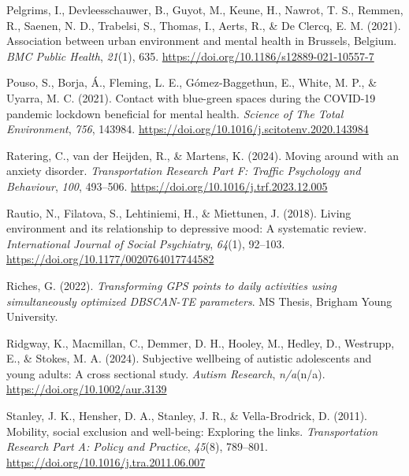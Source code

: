 \documentclass[
  letterpaper,
  number,
  review,
  3p]{elsarticle}
\newlength{\cslhangindent}
\newenvironment{CSLReferences}[2] %
 {\begin{list}{}{%
  \setlength{\itemindent}{0pt}
  \setlength{\leftmargin}{0pt}
  \setlength{\parsep}{0pt}
  \ifodd #1
   \setlength{\leftmargin}{\cslhangindent}
   \setlength{\itemindent}{-1\cslhangindent}
  \fi
  \setlength{\itemsep}{#2\baselineskip}}}
 {\end{list}}
\begin{document}
\begin{CSLReferences}{1}{0}
Pelgrims, I., Devleesschauwer, B., Guyot, M., Keune, H., Nawrot, T. S.,
Remmen, R., Saenen, N. D., Trabelsi, S., Thomas, I., Aerts, R., \& De
Clercq, E. M. (2021). Association between urban environment and mental
health in {Brussels}, {Belgium}. \emph{BMC Public Health}, \emph{21}(1),
635. \url{https://doi.org/10.1186/s12889-021-10557-7}

Pouso, S., Borja, Á., Fleming, L. E., Gómez-Baggethun, E., White, M. P.,
\& Uyarra, M. C. (2021). Contact with blue-green spaces during the
{COVID-19} pandemic lockdown beneficial for mental health. \emph{Science
of The Total Environment}, \emph{756}, 143984.
\url{https://doi.org/10.1016/j.scitotenv.2020.143984}

Ratering, C., van der Heijden, R., \& Martens, K. (2024). Moving around
with an anxiety disorder. \emph{Transportation Research Part F: Traffic
Psychology and Behaviour}, \emph{100}, 493--506.
\url{https://doi.org/10.1016/j.trf.2023.12.005}

Rautio, N., Filatova, S., Lehtiniemi, H., \& Miettunen, J. (2018).
Living environment and its relationship to depressive mood: {A}
systematic review. \emph{International Journal of Social Psychiatry},
\emph{64}(1), 92--103. \url{https://doi.org/10.1177/0020764017744582}

Riches, G. (2022). \emph{Transforming {GPS} points to daily activities
using simultaneously optimized {DBSCAN-TE} parameters}. MS Thesis,
Brigham Young University.

Ridgway, K., Macmillan, C., Demmer, D. H., Hooley, M., Hedley, D.,
Westrupp, E., \& Stokes, M. A. (2024). Subjective wellbeing of autistic
adolescents and young adults: {A} cross sectional study. \emph{Autism
Research}, \emph{n/a}(n/a). \url{https://doi.org/10.1002/aur.3139}

Stanley, J. K., Hensher, D. A., Stanley, J. R., \& Vella-Brodrick, D.
(2011). Mobility, social exclusion and well-being: {Exploring} the
links. \emph{Transportation Research Part A: Policy and Practice},
\emph{45}(8), 789--801. \url{https://doi.org/10.1016/j.tra.2011.06.007}


\end{CSLReferences}
\end{document}
